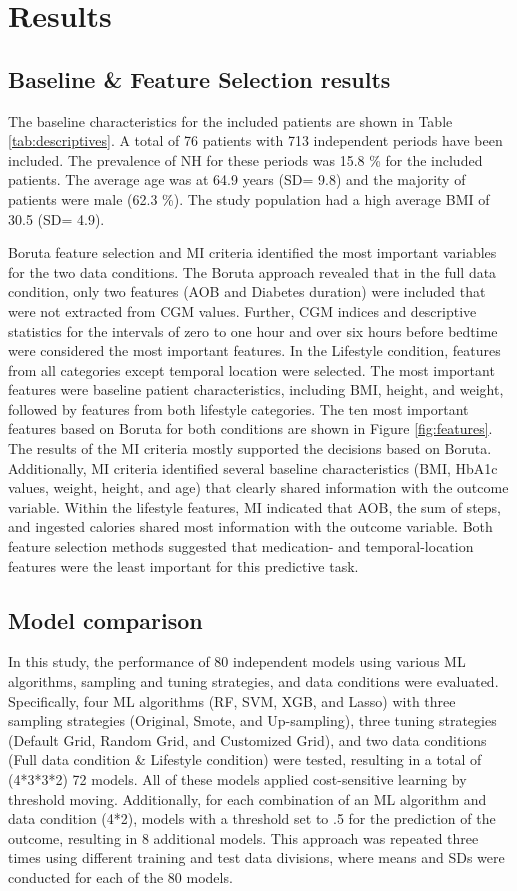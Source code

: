 \section{Results}
\label{Results}

\subsection{Baseline \& Feature Selection results}
The baseline characteristics for the included patients are shown in Table \ref{tab:descriptives}. A total of 76 patients with 713 independent periods have been included. The prevalence of NH for these periods was 15.8 \% for the included patients. The average age was at 64.9 years (SD= 9.8) and the majority of patients were male (62.3 \%). The study population had a high average BMI of 30.5 (SD= 4.9).

Boruta feature selection and MI criteria identified the most important variables for the two data conditions. The Boruta approach revealed that in the full data condition, only two features (AOB and Diabetes duration) were included that were not extracted from CGM values. Further, CGM indices and descriptive statistics for the intervals of zero to one hour and over six hours before bedtime were considered the most important features. In the Lifestyle condition, features from all categories except temporal location were selected. The most important features were baseline patient characteristics, including BMI, height, and weight, followed by features from both lifestyle categories. The ten most important features based on Boruta for both conditions are shown in Figure \ref{fig:features}.
The results of the MI criteria mostly supported the decisions based on Boruta. Additionally, MI criteria identified several baseline characteristics (BMI, HbA1c values, weight, height, and age) that clearly shared information with the outcome variable. Within the lifestyle features, MI indicated that AOB, the sum of steps, and ingested calories shared most information with the outcome variable. Both feature selection methods suggested that medication- and temporal-location features were the least important for this predictive task.

\subsection{Model comparison}
In this study, the performance of 80 independent models using various ML algorithms, sampling and tuning strategies, and data conditions were evaluated. Specifically, four ML algorithms (RF, SVM, XGB, and Lasso) with three sampling strategies (Original, Smote, and Up-sampling), three tuning strategies (Default Grid, Random Grid, and Customized Grid), and two data conditions (Full data condition \& Lifestyle condition) were tested, resulting in a total of (4*3*3*2) 72 models. All of these models applied cost-sensitive learning by threshold moving. Additionally, for each combination of an ML algorithm and data condition (4*2), models with a threshold set to .5 for the prediction of the outcome, resulting in 8 additional models. This approach was repeated three times using different training and test data divisions, where means and SDs were conducted for each of the 80 models.

